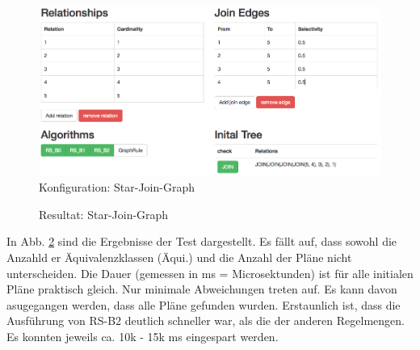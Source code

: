 \begin{figure}[ht]
  \centering
  \includegraphics[width=\textwidth]{05_ResultsEvaluation/00_media/left-deep5-star.png}
  \caption{Konfiguration: Star-Join-Graph}
  \label{left-deep5-star.png}
\end{figure}





\begin{figure}[ht]
\centering
{}
\caption{Resultat: Star-Join-Graph}
\label{Star-Join-Graph:Result}
\end{figure}

In Abb. \ref{Star-Join-Graph:Result} sind die Ergebnisse der Test dargestellt. Es fällt auf, dass sowohl die Anzahld er Äquivalenzklassen (Äqui.) und die Anzahl der Pläne nicht unterscheiden. Die Dauer (gemessen in ms = Microsektunden) ist für alle initialen Pläne praktisch gleich. Nur minimale Abweichungen treten auf. Es kann davon asugegangen werden, dass alle Pläne gefunden wurden. Erstaunlich ist, dass die Ausführung von RS-B2 deutlich schneller war, als die der anderen Regelmengen. Es konnten jeweils ca. 10k - 15k ms eingespart werden.

